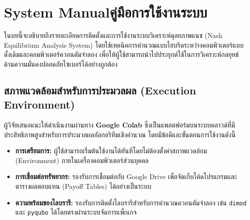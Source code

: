 \chapter{\ifenglish System Manual\else คู่มือการใช้งานระบบ\fi}

ในบทนี้จะอธิบายถึงรายละเอียดการติดตั้งและการใช้งานระบบวิเคราะห์ดุลยภาพแนช (Nash Equilibrium Analysis System) โดยใช้เทคนิคการคำนวณแบบไฮบริดระหว่างคอมพิวเตอร์แบบดั้งเดิมและคอมพิวเตอร์ควอนตัมจำลอง เพื่อให้ผู้ใช้สามารถนำไปประยุกต์ใช้ในการวิเคราะห์กลยุทธ์ด้านความมั่นคงปลอดภัยไซเบอร์ได้อย่างถูกต้อง

\section{สภาพแวดล้อมสำหรับการประมวลผล (Execution Environment)}
ผู้วิจัยเสนอแนะให้ดำเนินงานผ่านทาง \textbf{Google Colab} ซึ่งเป็นแพลตฟอร์มบนระบบคลาวด์ที่มีประสิทธิภาพสูงสำหรับการประมวลผลอัลกอริทึมเชิงคำนวณ โดยมีข้อดีและขั้นตอนการใช้งานดังนี้
\begin{itemize}
    \item \textbf{การเตรียมการ:} ผู้ใช้สามารถเริ่มต้นใช้งานได้ทันทีโดยไม่ต้องตั้งค่าสภาพแวดล้อม (Environment) ภายในเครื่องคอมพิวเตอร์ส่วนบุคคล 
    \item \textbf{การเชื่อมต่อทรัพยากร:} รองรับการเชื่อมต่อกับ Google Drive เพื่อจัดเก็บโค้ดโปรแกรมและตารางผลตอบแทน (Payoff Tables) ได้อย่างเป็นระบบ 
    \item \textbf{ความพร้อมของไลบรารี:} รองรับการติดตั้งไลบรารีสำหรับการคำนวณควอนตัมจำลอง เช่น \texttt{dimod} และ \texttt{pyqubo} ได้โดยตรงผ่านระบบจัดการแพ็กเกจ 
\end{itemize}



